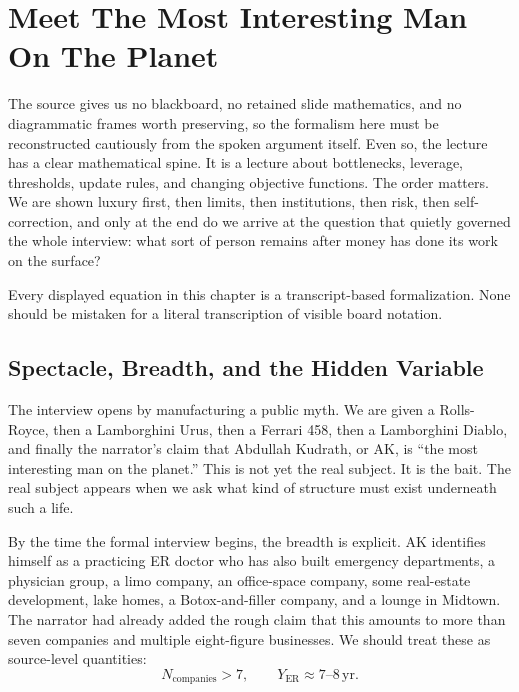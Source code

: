 \chapter{Meet The Most Interesting Man On The Planet}

The source gives us no blackboard, no retained slide mathematics, and no diagrammatic frames worth preserving, so the formalism here must be reconstructed cautiously from the spoken argument itself. Even so, the lecture has a clear mathematical spine. It is a lecture about bottlenecks, leverage, thresholds, update rules, and changing objective functions. The order matters. We are shown luxury first, then limits, then institutions, then risk, then self-correction, and only at the end do we arrive at the question that quietly governed the whole interview: what sort of person remains after money has done its work on the surface?

\begin{remark}
Every displayed equation in this chapter is a transcript-based formalization. None should be mistaken for a literal transcription of visible board notation.
\end{remark}

\section{Spectacle, Breadth, and the Hidden Variable}

The interview opens by manufacturing a public myth. We are given a Rolls-Royce, then a Lamborghini Urus, then a Ferrari 458, then a Lamborghini Diablo, and finally the narrator's claim that Abdullah Kudrath, or AK, is ``the most interesting man on the planet.'' This is not yet the real subject. It is the bait. The real subject appears when we ask what kind of structure must exist underneath such a life.

By the time the formal interview begins, the breadth is explicit. AK identifies himself as a practicing ER doctor who has also built emergency departments, a physician group, a limo company, an office-space company, some real-estate development, lake homes, a Botox-and-filler company, and a lounge in Midtown. The narrator had already added the rough claim that this amounts to more than seven companies and multiple eight-figure businesses. We should treat these as source-level quantities:
\begin{equation}
N_{\text{companies}} > 7,
\qquad
Y_{\text{ER}} \approx 7\text{--}8\,\mathrm{yr}.
\end{equation}

